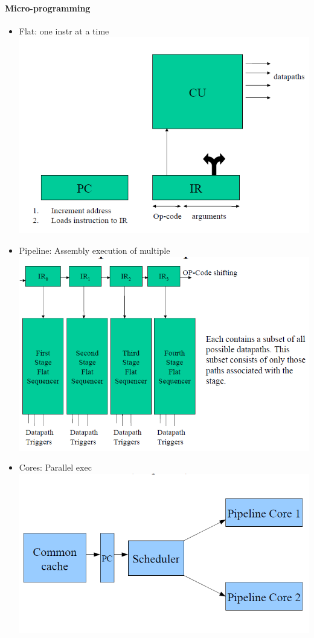 \documentclass[12 pt]{article}
\begin{document}
	\paragraph{Micro-programming}
	\begin{itemize}
	\item Flat: one instr at a time
	\\ \includegraphics[scale=0.6]{fcu}
	\item Pipeline: Assembly execution of multiple
	\\ \includegraphics[scale=0.5]{pcu}
	\item Cores: Parallel exec
	\\ \includegraphics[scale=0.5]{ccu}
\end{itemize}
\end{document}
